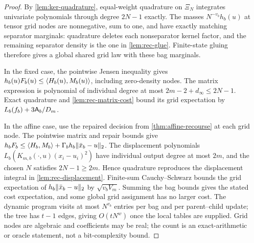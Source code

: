 \begin{proof}
By \cref{lem:ker-quadrature}, equal-weight quadrature on $\Xi_N$ integrates
univariate polynomials through degree $2N-1$ exactly. The masses
$N^{-v_b}h_b(u)$ at tensor grid nodes are nonnegative, sum to one, and have
exactly matching separator marginals: quadrature deletes each
nonseparator kernel factor, and the remaining separator density is the
one in \cref{lem:rec-glue}. Finite-state gluing therefore gives a global
shared grid law with these bag marginals.

In the fixed case, the pointwise Jensen inequality gives
$h_b(u)F_b(u)\le\langle H_b(u),M_b(u)\rangle$, including zero-density nodes. The
matrix expression is polynomial of individual degree at most
$2m-2+d_\infty\le2N-1$. Exact quadrature and
\cref{lem:rec-matrix-cost} bound its grid expectation by
$L_b(f_b)+3\mathsf{A}_b/D_m$.

In the affine case, use the repaired decision from
\cref{thm:affine-recourse} at each grid node. The pointwise matrix and
repair bounds give
$h_bF_b\le\langle H_b,M_b\rangle+\Gamma_bh_b\lVert \bar x_b-u\rVert_2$.
The displacement polynomials
$L_b(K_{m,b}(\cdot,u)(x_i-u_i)^2)$ have individual output degree at most
$2m$, and the chosen $N$ satisfies $2N-1\ge2m$. Hence quadrature
reproduces the displacement integral in \cref{lem:rec-displacement}.
Finite-sum Cauchy--Schwarz bounds the grid expectation of
$h_b\lVert \bar x_b-u\rVert_2$ by $\sqrt{v_bV_m}$. Summing the bag bounds
gives the stated cost expectation, and some global grid assignment has
no larger cost. The dynamic program visits at most $N^{v_b}$ entries per
bag and per parent--child update; the tree has $t-1$ edges, giving
$O(tN^w)$ once the local tables are supplied. Grid nodes are algebraic
and coefficients may be real; the count is an exact-arithmetic or oracle
statement, not a bit-complexity bound.
\end{proof}

